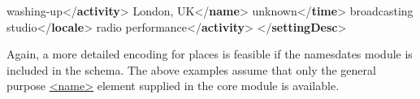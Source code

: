 \begin{shaded}
\hspace*{1em}washing-up{</\textbf{activity}>}\mbox{}\newline 
{}\mbox{}\newline 
{}\mbox{}\newline 
\hspace*{1em}London, UK{</\textbf{name}>}\mbox{}\newline 
\hspace*{1em}unknown{</\textbf{time}>}\mbox{}\newline 
\hspace*{1em}broadcasting studio{</\textbf{locale}>}\mbox{}\newline 
\hspace*{1em}radio performance{</\textbf{activity}>}\mbox{}\newline 
{}\mbox{}\newline 
{</\textbf{settingDesc}>}\end{shaded}\egroup\par \par
Again, a more detailed encoding for places is feasible if the \textsf{namesdates} module is included in the schema. The above examples assume that only the general purpose \hyperref[TEI.name]{<name>} element supplied in the core module is available.
